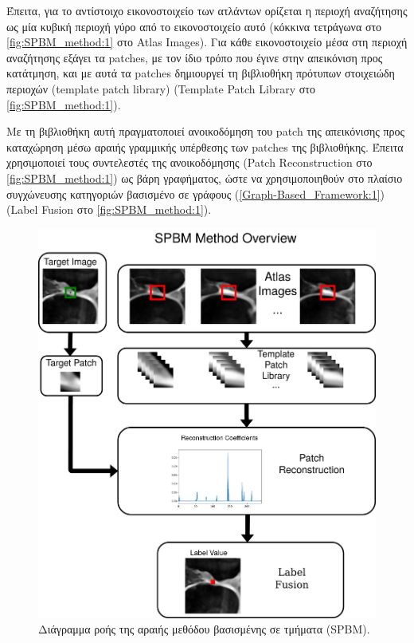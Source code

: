 \documentclass[a4paper,12pt]{article}
\begin{document}
Έπειτα, για το αντίστοιχο εικονοστοιχείο των ατλάντων ορίζεται η περιοχή
αναζήτησης ως μία κυβική περιοχή γύρο από το εικονοστοιχείο αυτό (κόκκινα
τετράγωνα στο \autoref{fig:SPBM_method:1} στο Atlas Images). Για κάθε
εικονοστοιχείο μέσα στη περιοχή αναζήτησης εξάγει τα patches, με τον ίδιο τρόπο
που έγινε στην απεικόνιση προς κατάτμηση, και με αυτά τα patches δημιουργεί τη
βιβλιοθήκη πρότυπων στοιχειώδη περιοχών (template patch library) (Template Patch
Library στο \autoref{fig:SPBM_method:1}).

Με τη βιβλιοθήκη αυτή πραγματοποιεί ανοικοδόμηση του patch της απεικόνισης προς
καταχώρηση μέσω αραιής γραμμικής υπέρθεσης των patches της βιβλιοθήκης. Έπειτα
χρησιμοποιεί τους συντελεστές της ανοικοδόμησης (Patch Reconstruction στο
\autoref{fig:SPBM_method:1}) ως βάρη γραφήματος, ώστε να χρησιμοποιηθούν στο
πλαίσιο συγχώνευσης κατηγοριών βασισμένο σε γράφους
(\ref{Graph-Based_Framework:1}) (Label Fusion στο \autoref{fig:SPBM_method:1}).

\begin{figure}[H]
    \centering
    \includegraphics[width=\linewidth]{SPBM_method.png}
    \caption{Διάγραμμα ροής της αραιής μεθόδου βασισμένης σε τμήματα (SPBM).}
    \label{fig:SPBM_method:1}
\end{figure}
\end{document}
